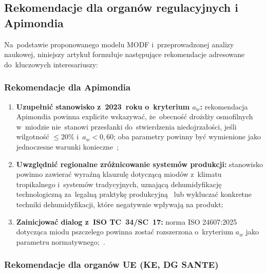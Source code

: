 \subsection{Rekomendacje dla organów regulacyjnych i Apimondia}

Na~podstawie proponowanego modelu MODF i~przeprowadzonej
analizy naukowej, niniejszy artykuł formułuje następujące
rekomendacje adresowane do~kluczowych interesariuszy:

\subsubsection{Rekomendacje dla Apimondia}

\begin{enumerate}
    \item \textbf{Uzupełnić stanowisko z~2023~roku o~kryterium
          $a_w$:} rekomendacja Apimondia powinna explicite
          wskazywać, że~obecność drożdży osmofilnych
          w~miodzie nie~stanowi przesłanki do~stwierdzenia
          niedojrzałości, jeśli wilgotność $\leq 20\%$
          i~$a_w < 0{,}60$; oba parametry powinny być
          wymienione jako jednoczesne warunki
          konieczne~\cite{ruegg1981,waaw2006};
    \item \textbf{Uwzględnić regionalne zróżnicowanie systemów
          produkcji:} stanowisko powinno zawierać
          wyraźną klauzulę dotyczącą miodów z~klimatu
          tropikalnego i~systemów tradycyjnych,
          uznającą dehumidyfikację technologiczną
          za~legalną praktykę produkcyjną~\cite{tadele2025} lub wykluczać konkretne techniki dehumidyfikacji, które negatywnie wpływają na produkt;
    \item \textbf{Zainicjować dialog z~ISO TC~34/SC~17:}
          norma ISO 24607:2025 dotycząca miodu pszczelego
          powinna zostać rozszerzona o~kryterium $a_w$
          jako parametru normatywnego;~\cite{codex_stan12}.
\end{enumerate}

\subsubsection{Rekomendacje dla organów UE (KE, DG SANTE)}

